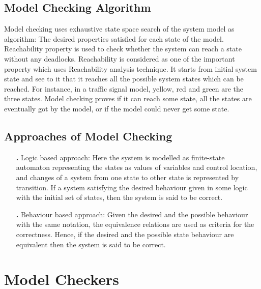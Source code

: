 \documentclass{article}
\begin{document}
\subsection{Model Checking Algorithm}
\label{sec:modcheckalg}

Model checking uses exhaustive state space search of the system model as 	algorithm: The desired properties satisfied for each state of the model. 	Reachability property is used to check whether the system can reach a state without any deadlocks. Reachability is considered as one of the important property which uses Reachability analysis technique. It starts from initial system state and see to it that it reaches all the possible system states which can be reached. For instance, in a traffic signal model, yellow, red and green are the three states. Model checking proves if it can reach some state, all the states are eventually got by the model, or if the model could never get some state.


\subsection{Approaches of Model Checking}
\label{sec:approchmodcheck}

\begin{itemize}
\item[\textbf{.}] Logic based approach: Here the system is modelled as finite-state automaton representing the states as values of variables and control location, and changes of a system from one state to other state is represented by transition. If a system satisfying the desired behaviour given in some logic with the initial set of states, then the system is said to be correct.

\end{itemize}
\begin{itemize}
\item[\textbf{.}]	Behaviour based approach: Given the desired and the possible behaviour with the same notation, the equivalence relations are used as criteria for the correctness. Hence, if the desired and the possible state behaviour are equivalent then the system is said to be correct.
\end{itemize}



\section{Model Checkers}
\label{sec:modelcheckers}
\end{document}
